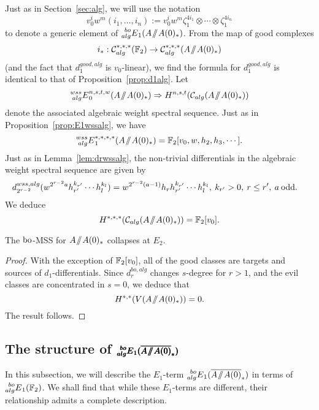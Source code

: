 Just as in Section~\ref{sec:alg}, we will use the notation 
\[ v_0^i w^m (i_1, \ldots, i_n) := v_0^i w^m \zeta_1^{4i_1}\otimes  \cdots \otimes \zeta_1^{4i_n} \]
to denote a generic element of $\prescript{bo}{alg}{E}_1(A \! \sslash \! A(0)_*)$.
From the map of good complexes
\[ i_* : \mathcal{C}_{alg}^{*,*,*}(\mathbb{F}_2) \rightarrow \mathcal{C}_{alg}^{*,*,*}(A \! \sslash \! A(0)_*) \]
(and the fact that $d_1^{good, alg}$ is $v_0$-linear), we find the formula for $d_1^{good, alg}$ is identical to that of Proposition~\ref{prop:d1alg}.
Let
\[ \prescript{wss}{alg}{E}_0^{n, s, t, w}(A \! \sslash \! A(0)_*) \Rightarrow H^{n, s, t}(\mathcal{C}_{alg}(A \! \sslash \! A(0)_*)) \]
denote the associated algebraic weight spectral sequence.  Just as in Proposition~\ref{prop:E1wssalg}, we have 
\[ \prescript{wss}{alg}{E}^{*,*,*,*}_1(A \! \sslash \! A(0)_*) = \mathbb{F}_2[v_0, w, h_2, h_3, \cdots ]. \]
Just as in Lemma~\ref{lem:drwssalg}, the non-trivial differentials in the algebraic weight spectral sequence are given by
\begin{align*}
d_{2^{r-2}}^{wss, alg}(w^{2^{r-2} a}h_{r'}^{k_{r'}}  \cdots h_l^{k_l}) & = w^{2^{r-2}(a-1)} h_r h_{r'}^{k_{r'}}  \cdots h_l^{k_l}, \: k_{r'} > 0, \: r \le r', \: a \: \mathrm{odd}. 
\end{align*}
We deduce
\[ H^{*,*,*}(\mathcal{C}_{alg}(A \! \sslash \! A(0)_*)) = \mathbb{F}_2[v_0]. \]

\begin{prop}\label{prop:boMSSAmodA0collapse}
The $\mathrm{bo}$-MSS for $A \! \sslash \! A(0)_*$ collapses at $E_2$.
\end{prop}

\begin{proof}
With the exception of $\mathbb{F}_2[v_0]$, all of the good classes are targets and sources of $d_1$-differentials.  Since
$d_r^{bo, alg}$ changes $s$-degree for $r > 1$, and the evil classes are concentrated in $s = 0$, we deduce that
\[ H^{*,*}(V(A \! \sslash \! A(0)_*)) = 0. \]
The result follows.
\end{proof}

\subsection*{The structure of $\pmb{\E{bo}{alg}_1(\AA0)}$}

In this subsection, we will describe the $E_1$-term $\E{bo}{alg}_1(\AA0)$ in terms of $\prescript{bo}{alg}{E}_1(\mathbb{F}_2)$.  We shall find that while these $E_1$-terms are different, their relationship admits a complete description.

